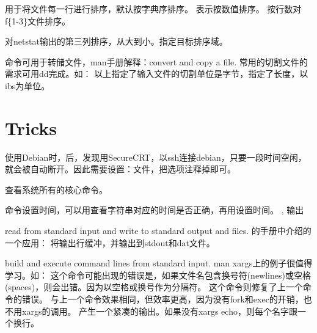 用于将文件每一行进行排序，默认按字典序排序。
表示按数值排序。
按行数对f\{1-3\}文件排序。

对netstat输出的第三列排序，从大到小。指定目标排序域。

命令可用于转储文件，man手册解释：convert and copy a file.
常用的切割文件的需求可用dd完成。如：
以上指定了输入文件的切割单位是字节，指定了长度，以ibs为单位。

\section{Tricks}



使用Debian时，后，发现用SecureCRT，以ssh连接debian，只要一段时间空闲，
就会被自动断开。因此需要设置：文件，把选项注释掉即可。

查看系统所有的核心命令。

命令设置时间，可以用查看字符串对应的时间是否正确，再用设置时间。
, 输出

read from standard input and write to standard output and files.
的手册中介绍的一个应用：
将输出行缓冲，并输出到stdout和dat文件。

build and execute command lines from standard input.
man xargs上的例子很值得学习。如：
这个命令可能出现的错误是，如果文件名包含换号符(newlines)或空格(spaces)，则会出错。因为以空格或换号作为分隔符。
这个命令则修复了上一个命令的错误。
与上一个命令效果相同，但效率更高，因为没有fork和exec的开销，也不用xargs的调用。
产生一个紧凑的输出。如果没有xargs echo，则每个名字跟一个换行。

